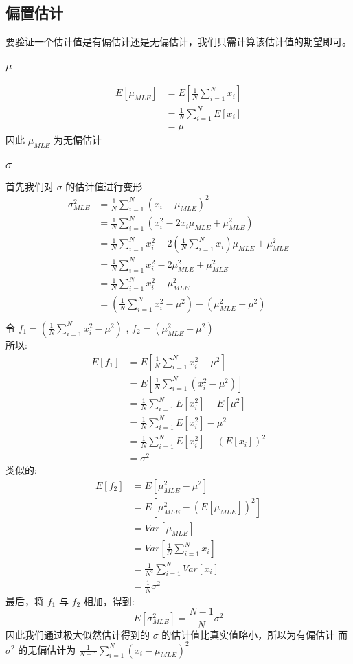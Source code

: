 \documentclass{report}
\begin{document}
\subsection{偏置估计}
要验证一个估计值是有偏估计还是无偏估计，我们只需计算该估计值的期望即可。
\subsubsection{$\mu$}
$$
\begin{aligned}
E[\mu_{MLE}]
&=E[\frac{1}{N}\sum_{i=1}^N x_i]\\
&=\frac{1}{N}\sum_{i=1}^N E[x_i]\\
&=\mu
\end{aligned}
$$
因此 $\mu_{MLE}$ 为无偏估计
\subsubsection{$\sigma$}
首先我们对 $\sigma$ 的估计值进行变形
$$
\begin{aligned}
\sigma_{MLE}^2
&=\frac{1}{N} \sum_{i=1} ^N (x_i - \mu_{MLE})^2\\
&=\frac{1}{N} \sum_{i=1} ^N (x_i^2 - 2x_i\mu_{MLE} + \mu_{MLE}^2)\\
&=\frac{1}{N} \sum_{i=1}^N x_i^2 - 2(\frac{1}{N} \sum_{i=1} ^N x_i) \mu_{MLE} + \mu_{MLE}^2\\
&=\frac{1}{N} \sum_{i=1}^N x_i^2 - 2\mu_{MLE}^2 + \mu_{MLE}^2\\
&=\frac{1}{N} \sum_{i=1}^N x_i^2 - \mu_{MLE}^2\\
&=(\frac{1}{N} \sum_{i=1}^N x_i^2-\mu^2) - (\mu_{MLE}^2-\mu^2)\\
\end{aligned}
$$
令 $f_1=(\frac{1}{N} \sum_{i=1}^N x_i^2-\mu^2)$ , $f_2=(\mu_{MLE}^2-\mu^2)$\\
所以:
$$
\begin{aligned}
E[f_1]
&=E[\frac{1}{N} \sum_{i=1}^N x_i^2 - \mu^2]\\
&=E[\frac{1}{N} \sum_{i=1}^N (x_i^2 - \mu^2)]\\
&=\frac{1}{N} \sum_{i=1}^N E[x_i^2] - E[\mu^2]\\
&=\frac{1}{N} \sum_{i=1}^N E[x_i^2] - \mu^2\\
&=\frac{1}{N} \sum_{i=1}^N E[x_i^2] - (E[x_i])^2\\
&=\sigma^2
\end{aligned}
$$
类似的:
$$
\begin{aligned}
E[f_2]
&=E[\mu_{MLE}^2 - \mu^2]\\
&=E[\mu_{MLE}^2 - (E[\mu_{MLE}])^2]\\
&=Var[\mu_{MLE}]\\
&=Var[\frac{1}{N} \sum_{i=1} ^N x_i]\\
&=\frac{1}{N^2} \sum_{i=1} ^N Var[x_i]\\
&=\frac{1}{N} \sigma^2
\end{aligned}
$$
最后，将 $f_1$ 与 $f_2$ 相加，得到:
$$
E[\sigma_{MLE}^2]=\frac{N-1}{N} \sigma^2
$$
因此我们通过极大似然估计得到的 $\sigma$ 的估计值比真实值略小，所以为有偏估计
而 $\sigma^2$ 的无偏估计为 $\frac{1}{N-1}\sum_{i=1}^N (x_i-\mu_{MLE})^2$
\end{document}
